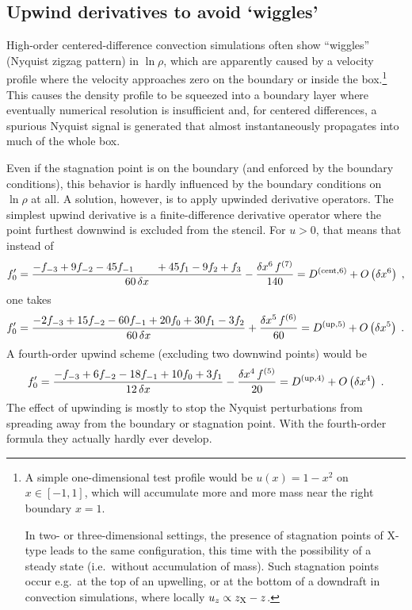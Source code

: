 \documentclass[\mydriver,12pt,twoside,notitlepage,a4paper]{article}
\begin{document}
\subsection{Upwind derivatives to avoid `wiggles'}
\label{S-upwind}
\newcommand{\Order}[1]{O\left(#1\right)}

High-order centered-difference convection simulations often show
``wiggles'' (Nyquist zigzag pattern) in $\ln\rho$, which are apparently
caused by a velocity profile where the velocity approaches zero on the
boundary or inside the box.\footnote{%
  A simple one-dimensional test profile would be $u(x) = 1-x^2$ on $x \in
  [-1,1]$, which will accumulate more and more mass near the right
  boundary $x=1$.

  In two- or three-dimensional settings, the presence of stagnation points
  of X-type leads to the same configuration, this time with the
  possibility of a steady state (i.e.~without accumulation of mass).
  Such stagnation points occur e.g.~at the top of an upwelling, or at
  the bottom of a downdraft in convection simulations, where locally
  $u_z \propto z_{\rm X}-z$.
}
This causes the density profile to be squeezed into a boundary layer where
eventually numerical resolution is insufficient and, for centered
differences, a spurious Nyquist signal is generated that almost
instantaneously propagates into much of the whole box.

Even if the stagnation point is on the boundary (and enforced by the
boundary conditions), this behavior is hardly influenced by the boundary
conditions on $\ln\rho$ at all.
A solution, however, is to apply upwinded derivative operators.
The simplest upwind derivative is a finite-difference derivative operator
where the point furthest downwind is excluded from the stencil.
For $u>0$, that means that instead of
\begin{equation}
  f'_0
  = \frac{-f_{-3} + 9 f_{-2} - 45 f_{-1} \qquad
           + 45 f_{1} - 9 f_{2} + f_{3}}
         {60\,\delta x}
    - \frac{\delta x^6\,f^{(7)}}{140}
  = D^{\rm(cent,6)} + \Order{\delta x^6} \; ,
\end{equation}
one takes
\begin{equation}
  f'_0
  = \frac{-2 f_{-3} + 15 f_{-2} - 60 f_{-1} + 20 f_{0} + 30 f_{1} - 3 f_{2}}
         {60\,\delta x}
    + \frac{\delta x^5\,f^{(6)}}{60}
  = D^{\rm(up,5)} + \Order{\delta x^5} \; .
\end{equation}
A fourth-order upwind scheme (excluding two downwind points) would be
\begin{equation}
  f'_0
  = \frac{-f_{-3} + 6 f_{-2} - 18 f_{-1} + 10 f_{0} + 3 f_{1}}
         {12\,\delta x}
    - \frac{\delta x^4\,f^{(5)}}{20}
  = D^{\rm(up,4)} + \Order{\delta x^4} \; .
\end{equation}
The effect of upwinding is mostly to stop the Nyquist perturbations from
spreading away from the boundary or stagnation point.
With the fourth-order formula they actually hardly ever develop.
\end{document}
